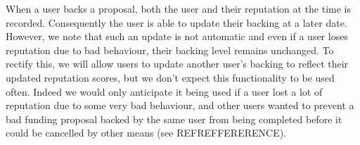 When a user backs a proposal, both the user and their reputation at the time is recorded. Consequently the user is able to update their backing at a later date. However, we note that such an update is not automatic and even if a user loses reputation due to bad behaviour, their backing level remains unchanged. To rectify this, we will allow users to update another user's backing to reflect their updated reputation scores, but we don't expect this functionality to be used often. Indeed we would only anticipate it being used if a user lost a lot of reputation due to some very bad behaviour, and other users wanted to prevent a bad funding proposal backed by the same user from being completed before it could be cancelled by other means (see REFREFFERERENCE). %





